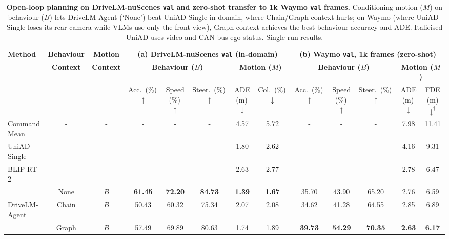 \begin{table}[!tp]
  \centering
  \caption[Open-loop planning on DriveLM-nuScenes and zero-shot Waymo transfer]{\textbf{Open-loop planning on DriveLM-nuScenes \texttt{val} and zero-shot transfer to 1k Waymo \texttt{val} frames.} Conditioning motion ($M$) on behaviour ($B$) lets DriveLM-Agent (`None') beat UniAD-Single in-domain, where Chain/Graph context hurts; on Waymo (where UniAD-Single loses its rear camera while VLMs use only the front view), Graph context achieves the best behaviour accuracy and ADE. Italicised UniAD uses video and CAN-bus ego status. Single-run results.}
  \label{drivelm:tab:arch}
  \small
  \setlength{\tabcolsep}{3pt}
  \begin{adjustbox}{max width=\textwidth}
  \begin{tabular}{l|cc|ccc|cc|ccc|cc}
    \toprule
    \multirow{3}{*}{\textbf{Method}} & \textbf{Behaviour} & \textbf{Motion} & \multicolumn{5}{c|}{\textbf{(a) DriveLM-nuScenes \texttt{val} (in-domain)}} & \multicolumn{5}{c}{\textbf{(b) Waymo \texttt{val}, 1k frames (zero-shot)}} \\
    \cmidrule(lr){4-8}\cmidrule(lr){9-13}
    & \textbf{Context} & \textbf{Context} & \multicolumn{3}{c|}{\textbf{Behaviour ($B$)}} & \multicolumn{2}{c|}{\textbf{Motion ($M$)}} & \multicolumn{3}{c|}{\textbf{Behaviour ($B$)}} & \multicolumn{2}{c}{\textbf{Motion ($M$)}} \\
    & & & Acc.\ (\%)\,$\uparrow$ & Speed (\%)\,$\uparrow$ & Steer.\ (\%)\,$\uparrow$ & ADE (m)\,$\downarrow$ & Col.\ (\%)\,$\downarrow$ & Acc.\ (\%)\,$\uparrow$ & Speed (\%)\,$\uparrow$ & Steer.\ (\%)\,$\uparrow$ & ADE (m)\,$\downarrow$ & FDE (m)$\downarrow^{\dagger}$ \\
    \midrule
    Command Mean & - & - & - & - & - & 4.57 & 5.72 & - & - & - & 7.98 & 11.41 \\
    UniAD-Single & - & - & - & - & - & 1.80 & 2.62 & - & - & - & 4.16 & 9.31 \\
    BLIP-RT-2 & - & - & - & - & - & 2.63 & 2.77 & - & - & - & 2.78 & 6.47 \\
    \midrule
    \rowcolor[gray]{0.9} & None & $B$ & \textbf{61.45} & \textbf{72.20} & \textbf{84.73} & \textbf{1.39} & \textbf{1.67} & 35.70 & 43.90 & 65.20 & 2.76 & 6.59 \\
    \rowcolor[gray]{0.9} DriveLM-Agent & Chain & $B$ & 50.43 & 60.32 & 75.34 & 2.07 & 2.08 & 34.62 & 41.28 & 64.55 & 2.85 & 6.89 \\
    \rowcolor[gray]{0.9} & Graph & $B$ & 57.49 & 69.89 & 80.63 & 1.74 & 1.89 & \textbf{39.73} & \textbf{54.29} & \textbf{70.35} & \textbf{2.63} & \textbf{6.17} \\

\end{tabular}
\end{adjustbox}
\end{table}
